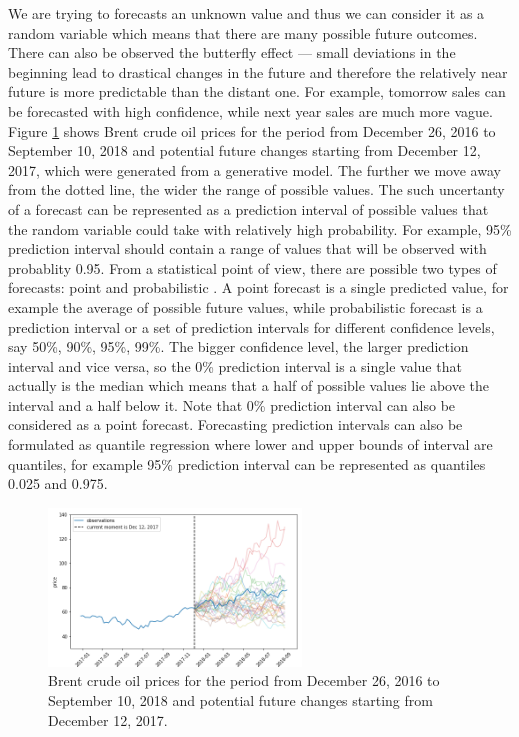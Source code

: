 \documentclass[12pt,a4paper]{article}
\begin{document}
We are trying to forecasts an unknown value and thus we can consider it as a random variable which means that there are many possible future outcomes. There can also be observed the butterfly effect — small deviations in the beginning lead to drastical changes in the future and therefore the relatively near future is more predictable than the distant one. For example, tomorrow sales can be forecasted with high confidence, while next year sales are much more vague. Figure \ref{fig:potential_future} shows Brent crude oil prices for the period from December 26, 2016 to September 10, 2018 and potential future changes starting from December 12, 2017, which were generated from a generative model. The further we move away from the dotted line, the wider the range of possible values. The such uncertanty of a forecast can be represented as a prediction interval of possible values that the random variable could take with relatively high probability. For example, 95\% prediction interval should contain a range of values that will be observed with probablity 0.95. From a statistical point of view, there are possible two types of forecasts: point and probabilistic \cite{fpp3}. A point forecast is a single predicted value, for example the average of possible future values, while probabilistic forecast is a prediction interval or a set of prediction intervals for different confidence levels, say 50\%, 90\%, 95\%, 99\%. The bigger confidence level, the larger prediction interval and vice versa, so the 0\% prediction interval is a single value that actually is the median which means that a half of possible values lie above the interval and a half below it. Note that 0\% prediction interval can also be considered as a point forecast. Forecasting prediction intervals can also be formulated as quantile regression where lower and upper bounds of interval are quantiles, for example 95\% prediction interval can be represented as quantiles 0.025 and 0.975.

\begin{figure}[h!]
    \centering
    \includegraphics[width=0.6\textwidth]{potential_future.png}
    \caption{Brent crude oil prices for the period from December 26, 2016 to September 10, 2018 and potential future changes starting from December 12, 2017.}
    \label{fig:potential_future}
\end{figure}
\end{document}
